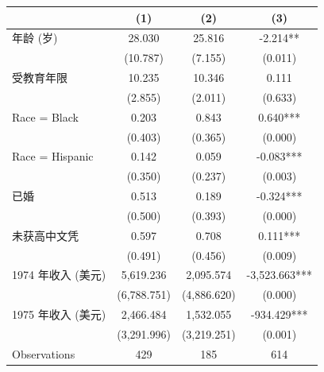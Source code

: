 \begin{tabular}{l*{3}c}
\toprule
 & (1) & (2) & (3) \\
\midrule
年龄 (岁)&28.030&25.816&-2.214**\\
&(10.787)&(7.155)&(0.011)\\
受教育年限&10.235&10.346&0.111\\
&(2.855)&(2.011)&(0.633)\\
Race = Black&0.203&0.843&0.640***\\
&(0.403)&(0.365)&(0.000)\\
Race = Hispanic&0.142&0.059&-0.083***\\
&(0.350)&(0.237)&(0.003)\\
已婚&0.513&0.189&-0.324***\\
&(0.500)&(0.393)&(0.000)\\
未获高中文凭&0.597&0.708&0.111***\\
&(0.491)&(0.456)&(0.009)\\
1974 年收入 (美元)&5,619.236&2,095.574&-3,523.663***\\
&(6,788.751)&(4,886.620)&(0.000)\\
1975 年收入 (美元)&2,466.484&1,532.055&-934.429***\\
&(3,291.996)&(3,219.251)&(0.001)\\
\midrule
Observations & 429 & 185 & 614 \\
\bottomrule
\end{tabular}
